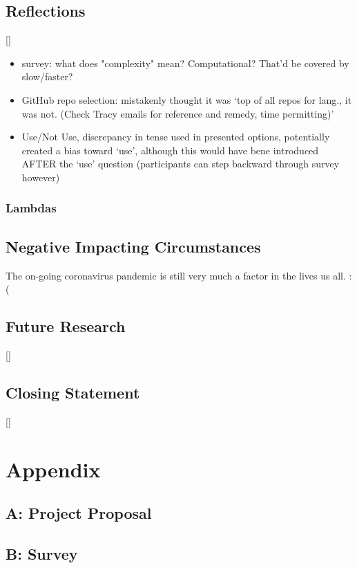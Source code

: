 \documentclass{article}
\begin{document}
    \subsection{Reflections}
        []
        \begin{itemize}
            \item survey: what does "complexity" mean? Computational? That'd be covered by slow/faster?
            \item GitHub repo selection: mistakenly thought it was `top of all repos for lang., it was not. (Check Tracy emails for reference and remedy, time permitting)'
            \item Use/Not Use, discrepancy in tense used in presented options, potentially created a bias toward `use', although this would have bene introduced AFTER the `use' question (participants can step backward through survey however)
        \end{itemize}

        \subsubsection{Lambdas}
        \label{subsubsec:lambdas}

        
    \subsection{Negative Impacting Circumstances}
        The on-going coronavirus pandemic is still very much a factor in the lives us all. :(
    \subsection{Future Research}
        []
    \subsection{Closing Statement}
        []

\newpage

\newpage
\section*{Appendix}
    \subsection*{A: Project Proposal}
        
    \subsection*{B: Survey}
    \label{apx:survey}
        
\end{document}
